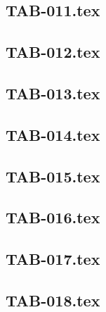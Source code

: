 \renewcommand{\xxexo}{TAB-011.tex} 
\subsection*{\xxexo} 
\graphicspath{{../../exos/tableaux/TAB-011/}}
 
 
\renewcommand{\xxexo}{TAB-012.tex} 
\subsection*{\xxexo} 
\graphicspath{{../../exos/tableaux/TAB-012/}}
 
 
\renewcommand{\xxexo}{TAB-013.tex} 
\subsection*{\xxexo} 
\graphicspath{{../../exos/tableaux/TAB-013/}}
 
 
\renewcommand{\xxexo}{TAB-014.tex} 
\subsection*{\xxexo} 
\graphicspath{{../../exos/tableaux/TAB-014/}}
 
 
\renewcommand{\xxexo}{TAB-015.tex} 
\subsection*{\xxexo} 
\graphicspath{{../../exos/tableaux/TAB-015/}}
 
 
\renewcommand{\xxexo}{TAB-016.tex} 
\subsection*{\xxexo} 
\graphicspath{{../../exos/tableaux/TAB-016/}}
 
 
\renewcommand{\xxexo}{TAB-017.tex} 
\subsection*{\xxexo} 
\graphicspath{{../../exos/tableaux/TAB-017/}}
 
 
\renewcommand{\xxexo}{TAB-018.tex} 
\subsection*{\xxexo} 
\graphicspath{{../../exos/tableaux/TAB-018/}}
 
 

